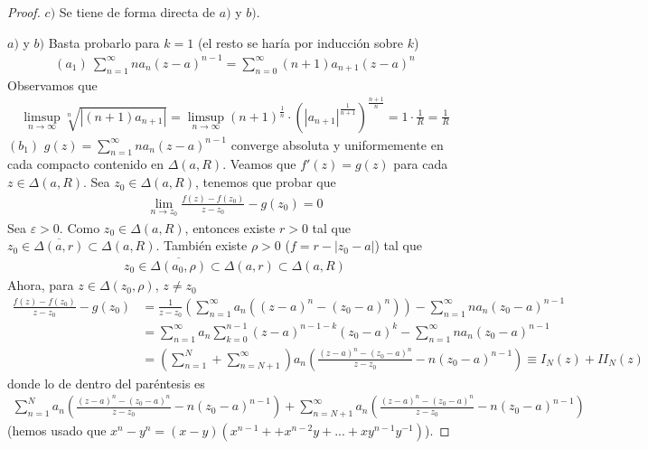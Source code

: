 \begin{proof}
    $c)$ Se tiene de forma directa de $a)$ y $b)$.

    $a)$ y $b)$ Basta probarlo para $k = 1$ (el resto se haría por inducción sobre $k$)
    \begin{align*}
        (a_1) \ \sum_{n=1}^{\infty}{na_n(z-a)^{n-1}} = \sum_{n=0}^{\infty}{(n+1)a_{n+1}(z-a)^n}
    \end{align*}
    Observamos que
    \begin{align*}
        \limsup_{n \to \infty}{\sqrt[n]{|(n+1)a_{n+1}|}} = \limsup_{n \to \infty}{(n+1)^{\frac{1}{n}} \cdot \left( |a_{n+1}|^{\frac{1}{n+1}}\right)^{\frac{n+1}{n}}} = 1 \cdot \frac{1}{R} = \frac{1}{R}
    \end{align*}
    $(b_1)$ $g(z) = \sum_{n=1}^{\infty}{na_n(z-a)^{n-1}}$ converge absoluta y uniformemente en cada compacto contenido en $\Delta(a,R)$. Veamos que $f'(z) = g(z)$ para cada $z \in \Delta(a,R)$. Sea $z_0 \in \Delta(a,R)$, tenemos que probar que
    \begin{align*}
        \lim_{n \to z_0}{\frac{f(z) - f(z_0)}{z-z_0} - g(z_0) = 0}
    \end{align*}
    Sea $\varepsilon > 0$. Como $z_0 \in \Delta(a,R)$, entonces existe $r > 0$ tal que $z_0 \in \overline{\Delta(a,r)} \subset \Delta(a,R)$. También existe $\rho > 0$ ($f = r - |z_0 -a|$) tal que
    \begin{align*}
        z_0 \in \overline{\Delta(a_0,\rho)} \subset \Delta(a,r) \subset \Delta(a,R)
    \end{align*}
    Ahora, para $z \in \Delta(z_0,\rho)$, $z \not = z_0$
    \begin{align*}
        \frac{f(z) - f(z_0)}{z-z_0} - g(z_0) & = \frac{1}{z-z_0}\left( \sum_{n=1}^{\infty}{a_n((z-a)^n - (z_0 - a)^n)}\right) - \sum_{n=1}^{\infty}{na_n(z_0 -a)^{n-1}}                           \\
                                             & = \sum_{n=1}^{\infty}{a_n \sum_{k=0}^{n-1}{(z-a)^{n-1-k}(z_0 -a)^k}} - \sum_{n=1}^{\infty}{na_n(z_0-a)^{n-1}}                                      \\
                                             & = \left( \sum_{n=1}^{N} + \sum_{n=N+1}^{\infty}\right)a_n\left( \frac{(z-a)^{n} - (z_0-a)^n}{z-z_0} -n(z_0-a)^{n-1}\right) \equiv I_N(z) + II_N(z)
    \end{align*}
    donde lo de dentro del paréntesis es
    \begin{align*}
        \sum_{n=1}^{N}{a_n\left( \frac{(z-a)^n - (z_0-a)^n}{z-z_0} - n(z_0-a)^{n-1}\right)} + \sum_{ n= N+1}^{\infty}{a_n\left( \frac{(z-a)^n - (z_0-a)^n}{z-z_0} -n(z_0-a)^{n-1}\right)}
    \end{align*}
    (hemos usado que $x^n - y^n = (x-y)(x^{n-1} + +x^{n-2}y + ... + xy^{n-1}  y^{-1})$).


\end{proof}
